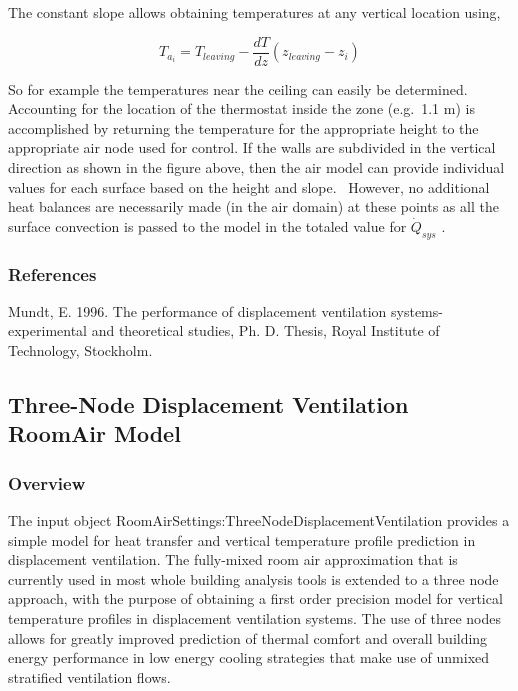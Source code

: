 The constant slope allows obtaining temperatures at any vertical location using,

\begin{equation}
{T_{{a_i}}} = {T_{leaving}} - \frac{{dT}}{{dz}}({z_{leaving}} - {z_i})
\end{equation}

So for example the temperatures near the ceiling can easily be determined. Accounting for the location of the thermostat inside the zone (e.g.~1.1 m) is accomplished by returning the temperature for the appropriate height to the appropriate air node used for control. If the walls are subdivided in the vertical direction as shown in the figure above, then the air model can provide individual values for each surface based on the height and slope.~ However, no additional heat balances are necessarily made (in the air domain) at these points as all the surface convection is passed to the model in the totaled value for \({\dot Q_{sys}}\) .

\subsubsection{References}\label{references-1-001}

Mundt, E. 1996. The performance of displacement ventilation systems-experimental and theoretical studies, Ph. D. Thesis, Royal Institute of Technology, Stockholm.

\subsection{Three-Node Displacement Ventilation RoomAir Model}\label{three-node-displacement-ventilation-roomair-model}

\subsubsection{Overview}\label{overview-005}

The input object RoomAirSettings:ThreeNodeDisplacementVentilation provides a simple model for heat transfer and vertical temperature profile prediction in displacement ventilation. The fully-mixed room air approximation that is currently used in most whole building analysis tools is extended to a three node approach, with the purpose of obtaining a first order precision model for vertical temperature profiles in displacement ventilation systems. The use of three nodes allows for greatly improved prediction of thermal comfort and overall building energy performance in low energy cooling strategies that make use of unmixed stratified ventilation flows.


